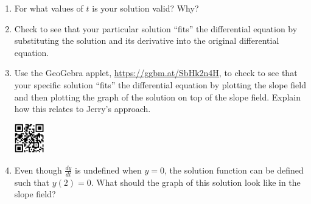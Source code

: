 \begin{enumerate}[resume]
\begin{enumerate}
\item	 For what values of $t$ is your solution valid? Why? \label{05problem6parta} 
\vskip1cm

\item Check to see that your {particular} solution ``fits'' the differential equation by substituting the solution and its derivative into the original differential equation. \label{05problem6partb} 
\vfill

\item	Use the GeoGebra applet, \href{https://ggbm.at/SbHk2n4H}{\underline{https://ggbm.at/SbHk2n4H}}, to check to see that your specific solution ``fits'' the differential equation by plotting the slope field and then plotting the graph of the solution on top of the slope field. Explain how this relates to Jerry's approach. \label{05problem6partc}

\vspace{-.25in}\hspace{-.75in}\includegraphics[width=0.5in]{05/05IVPQR.png}
\vfill

\item Even though $\displaystyle\frac{dy}{dt}$ is undefined when $y=0$, the solution function can be defined such that $y(2)=0$.  What should the graph of this solution look like in the slope field? \label{05problem6partd} 
\vfill
\end{enumerate}

\end{enumerate}

\clearpage


